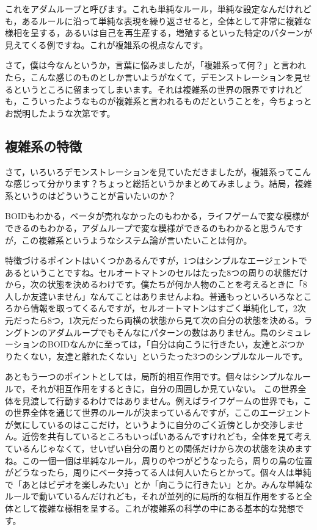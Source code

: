 \documentclass{ltjsbook}
\begin{document}
これをアダムループと呼びます。これも単純なルール，単純な設定なんだけれども，あるルールに沿って単純な表現を繰り返させると，全体として非常に複雑な様相を呈する，あるいは自己を再生産する，増殖するといった特定のパターンが見えてくる例ですね。これが複雑系の視点なんです。

さて，僕は今なんというか，言葉に悩みましたが，「複雑系って何？」と言われたら，こんな感じのものとしか言いようがなくて，デモンストレーションを見せるというところに留まってしまいます。それは複雑系の世界の限界ですけれども，こういったようなものが複雑系と言われるものだということを，今ちょっとお説明したような次第です。

\subsection{複雑系の特徴}
さて，いろいろデモンストレーションを見ていただきましたが，複雑系ってこんな感じって分かります？ちょっと総括というかまとめてみましょう。結局，複雑系というのはどういうことが言いたいのか？

BOIDもわかる，ベータが売れなかったのもわかる，ライフゲームで変な模様ができるのもわかる，アダムループで変な模様ができるのもわかると思うんですが，この複雑系というようなシステム論が言いたいことは何か。

特徴づけるポイントはいくつかあるんですが，1つはシンプルなエージェントであるということですね。セルオートマトンのセルはたった8つの周りの状態だけから，次の状態を決めるわけです。僕たちが何か人物のことを考えるときに「8人しか友達いません」なんてことはありませんよね。普通もっといろいろなところから情報を取ってくるんですが，セルオートマトンはすごく単純化して，2次元だったら8つ，1次元だったら両横の状態から見て次の自分の状態を決める。ラングトンのアダムループでもそんなにパターンの数はありません。鳥のシミュレーションのBOIDなんかに至っては，「自分は向こうに行きたい，友達とぶつかりたくない，友達と離れたくない」というたった3つのシンプルなルールです。

あともう一つのポイントとしては，局所的相互作用です。個々はシンプルなルールで，それが相互作用をするときに，自分の周囲しか見ていない。
この世界全体を見渡して行動するわけではありません。例えばライフゲームの世界でも，この世界全体を通じて世界のルールが決まっているんですが，ここのエージェントが気にしているのはここだけ，というように自分のごく近傍としか交渉しません。近傍を共有しているところもいっぱいあるんですけれども，全体を見て考えているんじゃなくて，せいぜい自分の周りとの関係だけから次の状態を決めますね。この一個一個は単純なルール，周りのやつがどうなったら，周りの鳥の位置がどうなったら，周りにベータ持ってる人は何人いたらとかって。個々人は単純で「あとはビデオを楽しみたい」とか「向こうに行きたい」とか。みんな単純なルールで動いているんだけれども，それが並列的に局所的な相互作用をすると全体として複雑な様相を呈する。これが複雑系の科学の中にある基本的な発想です。
\end{document}
